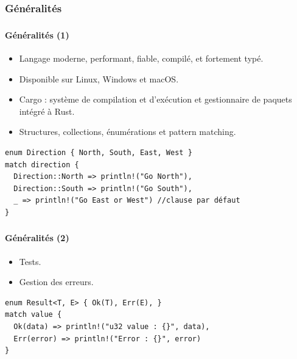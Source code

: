 \documentclass[10pt]{beamer}
\begin{document}
\subsubsection{Généralités}
\begin{frame}[fragile]
    \frametitle{\subsecname}
    \framesubtitle{Généralités (1)}
    \begin{itemize}
        \item Langage moderne, performant, fiable, compilé, et fortement typé.
        \item Disponible sur Linux, Windows et macOS.
        \item Cargo : système de compilation et d’exécution et gestionnaire de paquets intégré à Rust.
        \item Structures, collections, énumérations et pattern matching. 
    \end{itemize}

    \begin{verbatim}
enum Direction { North, South, East, West }
match direction {
  Direction::North => println!("Go North"),
  Direction::South => println!("Go South"),
  _ => println!("Go East or West") //clause par défaut
}
    \end{verbatim}
\end{frame}

\begin{frame}[fragile]
    \frametitle{\subsecname}
    \framesubtitle{Généralités (2)}
    \begin{itemize}
        \item Tests.
        \item Gestion des erreurs.
    \end{itemize}
    \begin{verbatim}
enum Result<T, E> { Ok(T), Err(E), }
match value {
  Ok(data) => println!("u32 value : {}", data),
  Err(error) => println!("Error : {}", error)
}
    \end{verbatim}
\end{frame}
\end{document}
